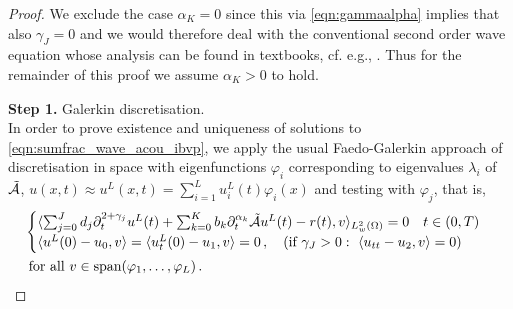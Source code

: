 \begin{proof}
We exclude the case $\alpha_K=0$ since this via \eqref{eqn:gammaalpha} implies that also $\gamma_J=0$ and we would therefore deal with the conventional second order wave equation whose analysis can be found in textbooks, cf. e.g., \cite{Evans:2010}. Thus for the remainder of this proof we assume $\alpha_K>0$ to hold.

\noindent
{\bf Step 1.} Galerkin discretisation.\\
In order to prove existence and uniqueness of solutions to \eqref{eqn:sumfrac_wave_acou_ibvp},
we apply the usual Faedo-Galerkin approach of discretisation in space with eigenfunctions $\varphi_i$ corresponding to eigenvalues $\lambda_i$ of $\tilde{\mathcal{A}}$, 
$u(x,t)\approx u^L(x,t)=\sum_{i=1}^L u^L_i(t)\varphi_i(x)$ and testing with $\varphi_j$, that is,
\begin{equation}\label{eqn:Galerkin}
\begin{aligned}
&\begin{cases}
\langle \sum_{j=0}^J d_j \partial_t^{2+\gamma_j} u^L(t) + \sum_{k=0}^K b_k \partial_t^{\alpha_k} 
\tilde{\mathcal{A}} u^L(t) - r(t),v\rangle_{L^2_w(\Omega)} = 0 \quad t\in(0,T)\\
\langle u^L(0)-u_0,v\rangle = \langle u^L_t(0)-u_1,v\rangle = 0\,, \quad
(\mbox{if }\gamma_J>0:\ \langle u_{tt} - u_2,v\rangle = 0)
\end{cases}\\
&\mbox{ for all }v\in\mbox{span}(\varphi_1,\ldots, \varphi_L)\,.
\end{aligned}
\end{equation}
\begin{comment}
Due to the fact that the eigenfunctions $\varphi_i$ form an orthonormal basis of $L^2_w(\Omega)$, we can write the second line of \eqref{eqn:Galerkin} as $u^L(0)=u_0^L$, $u^L_t(0)=u_1^L$, ($u^L_{tt}(0)=u_2^L$,) with $u_k^L(x)= \sum_{i=1}^L\langle u_k,\varphi_i\rangle \varphi_i(x)$.
The projected {\sc pde} initial value problem \eqref{eqn:Galerkin} leads to the {\sc ode} system 
\begin{equation}\label{eqn:Galerkin_ode}
\sum_{j=0}^J M_{d,j}^L \partial_t^{2+\gamma_j} \underline{u}^L(t) 
+ \sum_{k=0}^K K_{b,k}^L \partial_t^{\alpha_k} \underline{u}^L(t)
= \underline{r}^L(t) \,, \quad t\in(0,T)
\end{equation}
with initial conditions
\begin{equation}\label{eqn:Galerkin_init}
\underline{u}^L(0)=\underline{u}_0^L\,, \quad
\underline{u}_t^L(0)=\underline{u}_1^L\,, \quad

\end{comment}
\end{proof}
